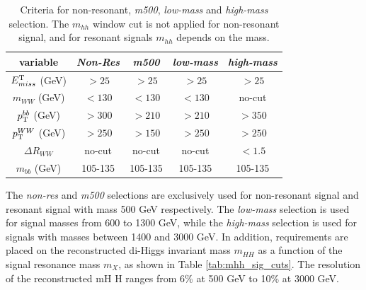 \begin{table}
\begin{center}
\begin{tabular}{c|c|c|c|c}
 variable & \emph{Non-Res} & \emph{m500} & \emph{low-mass} & \emph{high-mass}\\
\hline
$E^{\rm T}_{miss}$ (GeV)		&$> 25$&$>25$&$> 25$& $> 25$ \\
$m_{WW}$ (GeV) 	   		&$< 130$ &$< 130$ & $< 130$& no-cut\\
$p_{\rm T}^{bb}$ (GeV) 		&$> 300$& $> 210$&$> 210$&$> 350$\\
$p_{\rm T}^{WW}$ (GeV) 		&$> 250$&$> 150$&$> 250$&$> 250$ \\
$\Delta R_{WW}$  		&no-cut& no-cut&no-cut&$<1.5$\\
$m_{bb}$ (GeV)   		&105-135&105-135&105-135&105-135\\
\end{tabular}
\caption[Criteria for non-resonant, \emph{m500}, \emph{low-mass} and 
    \emph{high-mass} selection]{Criteria for non-resonant, \emph{m500}, \emph{low-mass} and 
    \emph{high-mass} selection. The $m_{hh}$ window cut is not applied for 
    non-resonant signal, and for resonant signals $m_{hh}$ depends on 
    the mass.} 
\label{tab:sig_reg_summary}
\end{center}
\end{table}


The \textit{non-res} and \textit{m500} selections are exclusively used for non-resonant signal and resonant signal with mass 500 GeV respectively. The \textit{low-mass} selection is used for signal masses from 600 to 1300 GeV, while the \textit{high-mass} selection is used for signals with masses between 1400 and 3000 GeV. In addition, requirements are placed on the reconstructed di-Higgs invariant mass ${m_{HH}}$ as a function of the signal resonance mass ${m_{X}}$, as shown in Table \ref{tab:mhh_sig_cuts}. The resolution of the reconstructed mH H ranges from 6\% at 500 GeV to 10\% at 3000 GeV.

